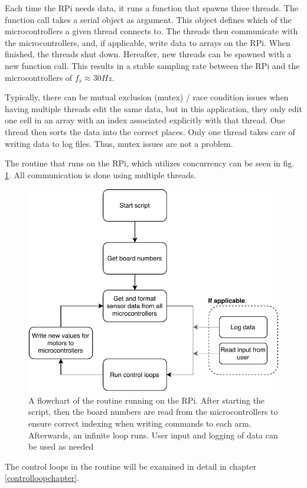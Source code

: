 Each time the RPi needs data, it runs a function that spawns three threads. The function call takes a serial object as argument. This object defines which of the microcontrollers a given thread connects to.
The threads then communicate with the microcontrollers, and, if applicable, write data to arrays on the RPi. When finished, the threads shut down. Hereafter, new threads can be spawned with a new function call. This results in a stable sampling rate between the RPi and the microcontrollers of $f_s \approx 30 Hz$.

Typically, there can be mutual exclusion (mutex) / race condition issues when having multiple threads edit the same data, but in this application, they only edit one cell in an array with an index associated explicitly with that thread. One thread then sorts the data into the correct places. Only one thread takes care of writing data to log files. Thus, mutex issues are not a problem. 

The routine that runs on the RPi, which utilizes concurrency can be seen in fig. \ref{fig:droneroutinechart}. All communication is done using multiple threads.

\begin{figure}[h]
    \centering
    \includegraphics{figures/communication_n_hardware/droneroutine.pdf}
    \caption{A flowchart of the routine running on the RPi. After starting the script, then the board numbers are read from the microcontrollers to ensure correct indexing when writing commands to each arm. Afterwards, an infinite loop runs. User input and logging of data can be used as needed}
    \label{fig:droneroutinechart}
\end{figure}
The control loops in the routine will be examined in detail in chapter \ref{controlloopchapter}. 

